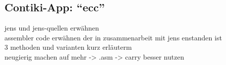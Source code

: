 \subsection{Contiki-App: "`ecc"'}

jens und jens-quellen erwähnen\\
assembler code erwähnen der in zusammenarbeit mit jens enstanden ist\\
3 methoden und varianten kurz erläuterm\\
neugierig machen auf mehr -> .asm -> carry besser nutzen